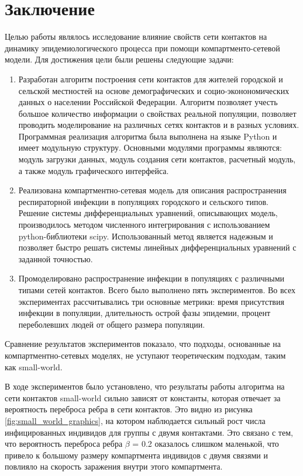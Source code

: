 \documentclass[14pt,a4paper]{article}
\begin{document}
\newpage



\section{Заключение}

Целью работы являлось исследование влияние свойств сети контактов на динамику эпидемиологического процесса при помощи компартменто-сетевой модели. Для достижения цели были решены следующие задачи:

\begin{enumerate}
	\item Разработан алгоритм построения сети контактов для жителей городской и сельской местностей на основе демографических и социо-эконономических данных о населении Российской Федерации. Алгоритм позволяет учесть большое количество информации о свойствах реальной популяции, позволяет проводить моделирование на различных сетях контактов и в разных условиях.  
	Программная реализация алгоритма была выполнена на языке Python и имеет модульную структуру. Основными модулями программы являются: модуль загрузки данных, модуль создания сети контактов, расчетный модуль, а также модуль графического интерфейса.

	\item  Реализована компартментно-сетевая модель для описания распространения респираторной инфекции в популяциях городского и сельского типов. 
	Решение системы дифференциальных уравнений, описывающих модель, производилось методом численного интегрирования с использованием python-библиотеки scipy. Использованный метод является надежным и позволяет быстро решать системы линейных дифференциальных уравнений с заданной точностью.
	 
	\item Промоделировано распространение инфекции в популяциях с различными типами сетей контактов. Всего было выполнено пять экспериментов.  Во всех экспериментах рассчитывались три основные метрики: время присутствия инфекции в популяции, длительность острой фазы эпидемии, процент переболевших людей от общего размера популяции.
\end{enumerate}


Сравнение результатов экспериментов показало, что подходы, основанные на компартментно-сетевых моделях, не уступают теоретическим подходам, таким как small-world. 

В ходе экспериментов было установлено, что результаты работы алгоритма на сети контактов small-world сильно зависят от константы, которая отвечает за вероятность переброса ребра в сети контактов. Это видно из рисунка \ref{fig:small_world_graphics}, на котором наблюдается сильный рост числа инфицированных индивидов для группы с двумя контактами. Это связано с тем, что вероятность переброса ребра $\beta$ = 0.2 оказалось слишком маленькой, что привело к большому размеру компартмента индивидов с двумя связями и повлияло на скорость заражения внутри этого компартмента.
\end{document}
